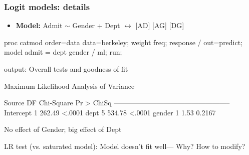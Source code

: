 \begin{frame}[fragile]
  \frametitle{Logit models: details}
  \begin{itemize}
	\item{\large\bfseries Model:} Admit $\sim$ Gender + Dept $\leftrightarrow$ [AD] [AG] [DG]
  \end{itemize}
\vspace{2ex}
\begin{Input}[fontsize=\small,label=\fbox{\texttt{catberk2.sas} $\cdots$},baselinestretch=0.7]
proc catmod order=data
            data=berkeley;
   weight freq;
   response / out=predict;
   model admit = dept gender / ml;
  run;
\end{Input}
 output:  Overall tests and goodness of fit
\begin{Output}[gobble=7,baselinestretch=0.7]
                    Maximum Likelihood Analysis of Variance
 
               Source               DF   Chi-Square    Pr > ChiSq
               --------------------------------------------------
               Intercept             1       262.49        <.0001
               dept                  5       534.78        <.0001
               gender                1         1.53        0.2167

\end{Output}
\begin{itemize*}
  \item No effect of Gender; big effect of Dept 
  \item LR test (vs. saturated model): Model doesn't fit well---  Why? How to  modify?
\end{itemize*}
\end{frame}

